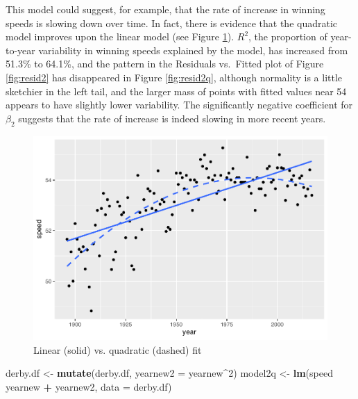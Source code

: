 \documentclass[
]{krantz}
\newenvironment{Shaded}{\begin{snugshade}}{\end{snugshade}}
\newcommand{\DataTypeTok}[1]{\textcolor[rgb]{0.27,0.27,0.27}{#1}}
\newcommand{\DecValTok}[1]{\textcolor[rgb]{0.06,0.06,0.06}{#1}}
\newcommand{\KeywordTok}[1]{\textcolor[rgb]{0.27,0.27,0.27}{\textbf{#1}}}
\newcommand{\NormalTok}[1]{#1}
\newcommand{\OperatorTok}[1]{\textcolor[rgb]{0.43,0.43,0.43}{\textbf{#1}}}
\newcommand{\StringTok}[1]{\textcolor[rgb]{0.5,0.5,0.5}{#1}}
\begin{document}
This model could suggest, for example, that the rate of increase in winning speeds is slowing down over time. In fact, there is evidence that the quadratic model improves upon the linear model (see Figure \ref{fig:models2and2q}). \(R^2\),  the proportion of year-to-year variability in winning speeds explained by the model, has increased from 51.3\% to 64.1\%, and the pattern in the Residuals vs.~Fitted plot of Figure \ref{fig:resid2} has disappeared in Figure \ref{fig:resid2q}, although normality is a little sketchier in the left tail, and the larger mass of points with fitted values near 54 appears to have slightly lower variability. The significantly negative coefficient for \(\beta_{2}\) suggests that the rate of increase is indeed slowing in more recent years.

\begin{figure}

{\centering \includegraphics[width=0.9\linewidth]{bookdown-BeyondMLR_files/figure-latex/models2and2q-1} 

}

\caption{Linear (solid) vs. quadratic (dashed) fit}\label{fig:models2and2q}
\end{figure}

\begin{Shaded}
\begin{Highlighting}[]
\NormalTok{derby.df <-}\StringTok{ }\KeywordTok{mutate}\NormalTok{(derby.df, }\DataTypeTok{yearnew2 =}\NormalTok{ yearnew}\OperatorTok{^}\DecValTok{2}\NormalTok{)}
\NormalTok{model2q <-}\StringTok{ }\KeywordTok{lm}\NormalTok{(speed }\OperatorTok{~}\StringTok{ }\NormalTok{yearnew }\OperatorTok{+}\StringTok{ }\NormalTok{yearnew2, }\DataTypeTok{data =}\NormalTok{ derby.df)}
\end{Highlighting}
\end{Shaded}
\end{document}
